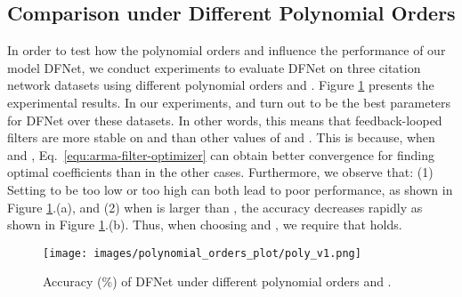 \documentclass{article}
\begin{document}
\subsection{Comparison under Different Polynomial Orders} \label{subsec:other-hyperparameters}

\begin{comment}
\begin{wrapfigure}[12]{r}{0.5\textwidth}
\vspace{-0.3cm}
\centering\vspace{-0.2cm}
\texttt{[image: images/polynomial\_orders\_plot/poly\_v1.png]}
\caption{Accuracy (\%) of DFNet under different polynomial orders  and .
    \label{fig:polynomialPlots}}
\end{wrapfigure}
\end{comment}

In order to test how the polynomial orders  and  influence the performance of our model DFNet, we conduct experiments to evaluate DFNet on three citation network datasets using different polynomial orders  and .
    Figure \ref{fig:polynomialPlots} presents the experimental results. In our experiments,  and  turn out to be the best parameters for DFNet over these datasets. In other words, this means that feedback-looped filters are more stable on  and  than other values of  and . This is because, when  and , Eq.~\ref{equ:arma-filter-optimizer} can obtain better convergence for finding optimal coefficients than in the other cases. Furthermore, we observe that: (1) Setting  to be too low or too high can both lead to poor performance, as shown in Figure \ref{fig:polynomialPlots}.(a), and (2) when  is larger than , the accuracy decreases rapidly as shown in Figure \ref{fig:polynomialPlots}.(b). Thus, when choosing  and , we require that  holds.

\begin{figure}[!h]
\vspace{-0.3cm}
\centering
\texttt{[image: images/polynomial\_orders\_plot/poly\_v1.png]}
\caption{Accuracy (\%) of DFNet under different polynomial orders  and .}
    \label{fig:polynomialPlots}
\end{figure}
\end{document}
